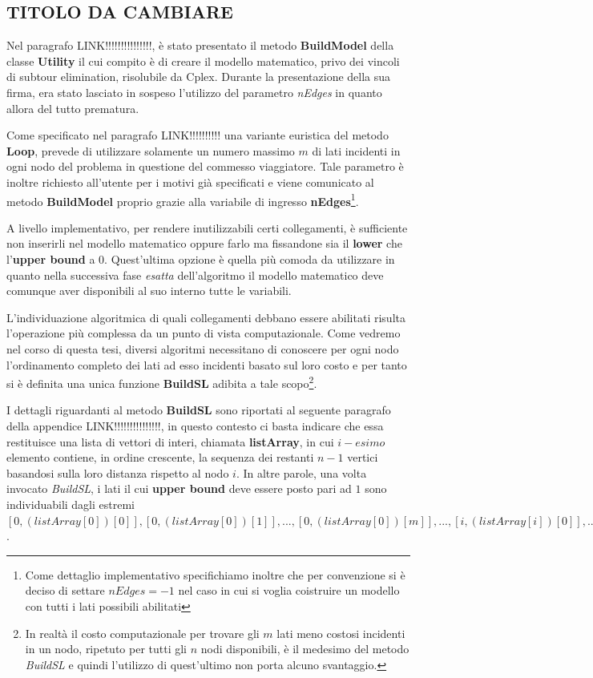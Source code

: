 \documentclass[11pt]{article}
\begin{document}
\subsection*{TITOLO DA CAMBIARE}

Nel paragrafo LINK!!!!!!!!!!!!!!!, è stato presentato il metodo \textbf{BuildModel} della classe \textbf{Utility} il cui compito è di creare il modello matematico, privo dei vincoli di subtour elimination, risolubile da Cplex. Durante la presentazione della sua firma, era stato lasciato in sospeso l'utilizzo del parametro \textit{nEdges} in quanto allora del tutto prematura.

Come specificato nel paragrafo LINK!!!!!!!!!! una variante euristica del metodo \textbf{Loop}, prevede di utilizzare solamente un numero massimo $m$ di lati incidenti in ogni nodo del problema in questione del commesso viaggiatore. Tale parametro è inoltre richiesto all'utente per i motivi già specificati e viene comunicato al metodo \textbf{BuildModel} proprio grazie alla variabile di ingresso \textbf{nEdges}\footnote{Come dettaglio implementativo specifichiamo inoltre che per convenzione si è deciso di settare $nEdges = -1$ nel caso in cui si voglia coistruire un modello con tutti i lati possibili abilitati}.

A livello implementativo, per rendere inutilizzabili certi collegamenti, è sufficiente non inserirli nel modello matematico oppure farlo ma fissandone sia il \textbf{lower} che l'\textbf{upper bound} a 0. Quest'ultima opzione è quella più comoda da utilizzare in quanto nella successiva fase \textit{esatta} dell'algoritmo il modello matematico deve comunque aver disponibili al suo interno tutte le variabili.

L'individuazione algoritmica di quali collegamenti debbano essere abilitati risulta l'operazione più complessa da un punto di vista computazionale. Come vedremo nel corso di questa tesi, diversi algoritmi necessitano di conoscere per ogni nodo l'ordinamento completo dei lati ad esso incidenti basato sul loro costo e per tanto si è definita una unica funzione \textbf{BuildSL} adibita a tale scopo\footnote{In realtà il costo computazionale per trovare gli $m$ lati meno costosi incidenti in un nodo, ripetuto per tutti gli $n$ nodi disponibili, è il medesimo del metodo \textit{BuildSL} e quindi l'utilizzo di quest'ultimo non porta alcuno svantaggio.}.

I dettagli riguardanti al metodo \textbf{BuildSL} sono riportati al seguente paragrafo della appendice LINK!!!!!!!!!!!!!!!, in questo contesto ci basta indicare che essa restituisce una lista di vettori di interi, chiamata \textbf{listArray}, in cui $i-esimo$ elemento contiene, in ordine crescente, la sequenza dei restanti $n-1$ vertici basandosi sulla loro distanza rispetto al nodo $i$. In altre parole, una volta invocato \textit{BuildSL}, i lati il cui \textbf{upper bound} deve essere posto pari ad $1$ sono individuabili dagli estremi $[0,(listArray[0])[0]], [0,(listArray[0])[1]], ..., [0,(listArray[0])[m]], ..., [i,(listArray[i])[0]], ..., [i,(listArray[i])[m]], ..., [n-1,(listArray[n-1])[0]], ..., [n-1,(listArray[n-1])[m]]$.
\end{document}
